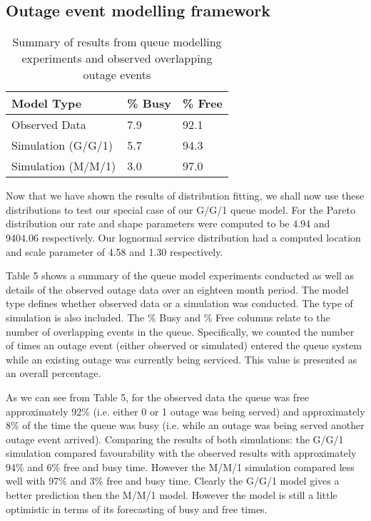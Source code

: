 \documentclass[5p]{elsarticle}
\begin{document}
\subsection{Outage event modelling framework}

\begin {table}[]
\caption {Summary of results from queue modelling experiments and observed overlapping outage events} 
\begin{center}
\begin{tabular}{l | l | l} \bf{Model Type} & \bf {\% Busy} & \bf {\% Free}
\\ \hline Observed Data & 7.9 &  92.1 
\\  Simulation (G/G/1) & 5.7 &  94.3 
\\  Simulation (M/M/1) & 3.0  &  97.0 
\\ \hline 
 \end{tabular}
\end{center}
\end{table}

Now that we have shown the results of distribution fitting, we shall now use these distributions to test our special case of our G/G/1 queue model. For the Pareto distribution our rate and shape parameters were computed to be 4.94 and 9404.06 respectively. Our 
lognormal service distribution had a computed location and scale parameter of 4.58 and 1.30 respectively.

Table 5 shows a summary of the queue model experiments conducted as well as details of the observed outage data over an eighteen month period. The model type defines whether observed data or a simulation was conducted. The type of simulation is also included. The \% Busy and \% Free columns relate to the number of overlapping events in the queue. Specifically, we counted the number of times an outage event (either observed or simulated) entered the queue system while an existing outage was currently being serviced. This value is presented as an overall percentage. 

As we can see from Table 5, for the observed data the queue was free approximately 92\% (i.e. either 0 or 1 outage was being served) and approximately 8\% of the time the queue was busy (i.e. while an outage was being served another outage event arrived). Comparing the results of both simulations: the G/G/1 simulation compared favourability with the observed results with approximately 94\% and 6\% free and busy time. However the M/M/1 simulation compared less well with 97\% and 3\% free and busy time. Clearly the G/G/1 model gives a better prediction then the M/M/1 model. However the model is still a little optimistic in terms of its forecasting of busy and free times.
\end{document}
